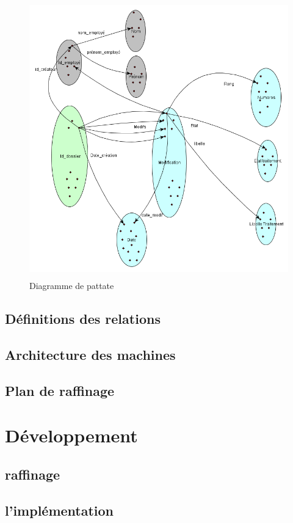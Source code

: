 \documentclass[11pt,a4paper]{article}
\begin{document}
\begin{figure}[h]
\includegraphics[height=12cm,width=17cm]{pattate.png}
  		\caption{Diagramme de pattate}
  		\label{pattate}
\end{figure}


\subsection{Définitions des relations}




\subsection{Architecture des machines}


\subsection{Plan de raffinage}


\section{Développement}

\subsection{raffinage}


\subsection{l'implémentation}
\end{document}
